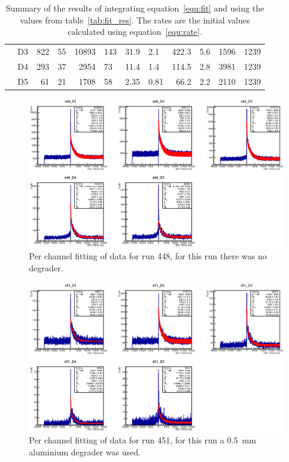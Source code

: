\begin{table}
\begin{center}
\begin{tabular}{c | c | r@{\(\,\pm\,\)}l | r@{\(\,\pm\,\)}l | r@{\(\,\pm\,\)}l | r@{\(\,\pm\,\)}l | r | l }
     & D3 &    822 &  55  &   10893 & 143  &    31.9\0& 2.1   &    422.3 &  5.6  &   1596 & 1239  \\
     & D4 &    293 &  37  &    2954 &  73  &    11.4\0& 1.4   &    114.5 &  2.8  &   3981 & 1239  \\
     & D5 &     61 &  21  &    1708 &  58  &     2.35 & 0.81  &     66.2 &  2.2  &   2110 & 1239  \\
  \end{tabular}
  \end{center}
  \caption{Summary of the results of integrating equation~\eqref{equ:fit} and using the values from table~\ref{tab:fit_res}. The rates are the initial values calculated using equation~\eqref{equ:rate}.}
  \label{tab:rates_res}
\end{table}

\begin{figure}
    \centering
      \includegraphics[scale=1]{images/momentum_spectrum/448.eps}
    \caption{Per channel fitting of data for run 448, for this run there was no degrader.}
    \label{fig:images_momentum_spectrum_448}
\end{figure}
%
\begin{figure}
    \centering
      \includegraphics[scale=1]{images/momentum_spectrum/451.eps}
    \caption{Per channel fitting of data for run 451, for this run a 0.5~mm aluminium degrader was used.}
    \label{fig:images_momentum_spectrum_451}
\end{figure}
